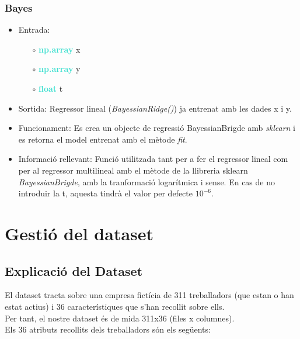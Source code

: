 \documentclass[a4paper, 11pt]{article}
\begin{document}
\subsubsection{Bayes}
\begin{itemize}
    \item Entrada:
    \begin{itemize}
        \item [$\circ$] \textbf{\textcolor{Turquoise}{np.array}} x
        \item [$\circ$] \textbf{\textcolor{Turquoise}{np.array}} y
        \item [$\circ$] \textbf{\textcolor{Turquoise}{float}} t
    \end{itemize}
    \item Sortida: Regressor lineal (\textit{BayessianRidge()}) ja entrenat amb les dades x i y.
    \item Funcionament: Es crea un objecte de regressió BayessianBrigde amb \textit{sklearn} i es retorna el model entrenat amb el mètode \textit{fit}.
    \item Informació rellevant: Funció utilitzada tant per a fer el regressor lineal com per al regressor multilineal amb el mètode de la llibreria sklearn \textit{BayessianBrigde}, amb la tranformació logarítmica i sense. En cas de no introduir la t, aquesta tindrà el valor per defecte $10^{-6}$. \label{bayes}
\end{itemize}

\newpage
\section{Gestió del dataset}
\subsection{Explicació del Dataset}
El dataset tracta sobre una empresa fictícia de 311 treballadors (que estan o han estat actius) i 36 característiques que s'han recollit sobre ells. \\
Per tant, el nostre dataset és de mida 311x36 (files x columnes). \\
Els 36 atributs recollits dels treballadors són els següents:
\end{document}
